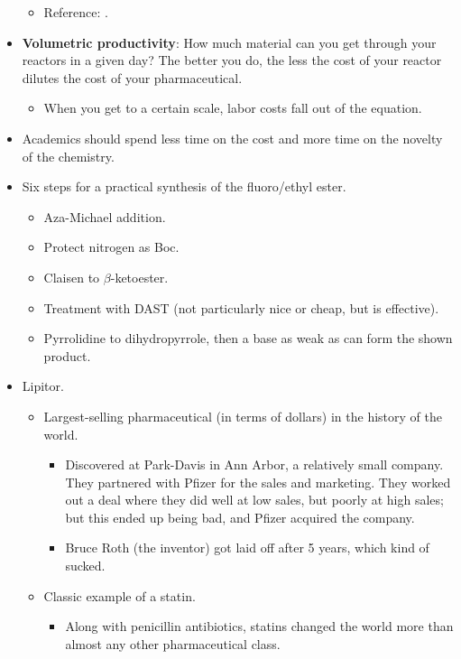 \documentclass[../notes.tex]{subfiles}
\begin{document}
\begin{itemize}
\begin{itemize}
        \item Reference: \textcite[6553]{bib:CSI}.
    \end{itemize}
    \item \textbf{Volumetric productivity}: How much material can you get through your reactors in a given day? The better you do, the less the cost of your reactor dilutes the cost of your pharmaceutical.
    \begin{itemize}
        \item When you get to a certain scale, labor costs fall out of the equation.
    \end{itemize}
    \item Academics should spend less time on the cost and more time on the novelty of the chemistry.
    \item Six steps for a practical synthesis of the fluoro/ethyl ester.
    \begin{itemize}
        \item Aza-Michael addition.
        \item Protect nitrogen as Boc.
        \item Claisen to $\beta$-ketoester.
        \item Treatment with DAST (not particularly nice or cheap, but is effective).
        \item Pyrrolidine to dihydropyrrole, then a base as weak as  can form the shown product.
    \end{itemize}
    \item Lipitor.
    \begin{itemize}
        \item Largest-selling pharmaceutical (in terms of dollars) in the history of the world.
        \begin{itemize}
            \item Discovered at Park-Davis in Ann Arbor, a relatively small company. They partnered with Pfizer for the sales and marketing. They worked out a deal where they did well at low sales, but poorly at high sales; but this ended up being bad, and Pfizer acquired the company.
            \item Bruce Roth (the inventor) got laid off after 5 years, which kind of sucked.
        \end{itemize}
        \item Classic example of a statin.
        \begin{itemize}
            \item Along with penicillin antibiotics, statins changed the world more than almost any other pharmaceutical class.

\end{itemize}
\end{itemize}
\end{itemize}
\end{document}
